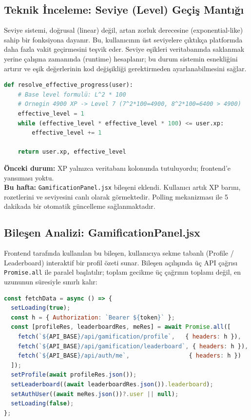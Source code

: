 \documentclass[12pt,a4paper]{article}
\begin{document}
\subsection{Teknik İnceleme: Seviye (Level) Geçiş Mantığı}
Seviye sistemi, doğrusal (linear) değil, artan zorluk derecesine (exponential-like) sahip bir fonksiyona dayanır. Bu, kullanıcının üst seviyelere çıktıkça platformda daha fazla vakit geçirmesini teşvik eder. Seviye eşikleri veritabanında saklanmak yerine çalışma zamanında (runtime) hesaplanır; bu durum sistemin esnekliğini artırır ve eşik değerlerinin kod değişikliği gerektirmeden ayarlanabilmesini sağlar.

\begin{lstlisting}[language=Python, caption=Backend XP ve Seviye Güncelleme Fonksiyonu]
def resolve_effective_progress(user):
    # Base level formulü: L^2 * 100
    # Ornegin 4900 XP -> Level 7 (7^2*100=4900, 8^2*100=6400 > 4900)
    effective_level = 1
    while (effective_level * effective_level * 100) <= user.xp:
        effective_level += 1
    
    return user.xp, effective_level
\end{lstlisting}

\begin{infobox}
  \small
  \textbf{Önceki durum:} XP yalnızca veritabanı kolonunda tutuluyordu; frontend'e yansıması yoktu.\\
  \textbf{Bu hafta:} \texttt{GamificationPanel.jsx} bileşeni eklendi. Kullanıcı artık XP barını, rozetlerini ve seviyesini canlı olarak görmektedir. Polling mekanizması ile 5 dakikada bir otomatik güncelleme sağlanmaktadır.
\end{infobox}

\subsection{Bileşen Analizi: GamificationPanel.jsx}
Frontend tarafında kullanılan bu bileşen, kullanıcıya sekme tabanlı (Profile / Leaderboard) interaktif bir profil özeti sunar. Bileşen açılışında üç API çağrısı \texttt{Promise.all} ile paralel başlatılır; toplam gecikme üç çağrının toplamı değil, en uzununun süresiyle sınırlı kalır:

\begin{lstlisting}[language=JavaScript, caption=GamificationPanel.jsx -- Paralel Veri Çekme (satır 17--38)]
const fetchData = async () => {
  setLoading(true);
  const h = { Authorization: `Bearer ${token}` };
  const [profileRes, leaderboardRes, meRes] = await Promise.all([
    fetch(`${API_BASE}/api/gamification/profile`,   { headers: h }),
    fetch(`${API_BASE}/api/gamification/leaderboard`, { headers: h }),
    fetch(`${API_BASE}/api/auth/me`,                 { headers: h })
  ]);
  setProfile(await profileRes.json());
  setLeaderboard((await leaderboardRes.json()).leaderboard);
  setAuthUser((await meRes.json())?.user || null);
  setLoading(false);
};
\end{lstlisting}
\end{document}
